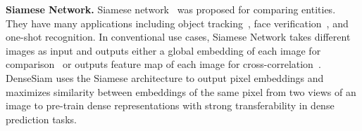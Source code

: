 \documentclass[runningheads]{llncs}
\newcommand{\tablestyle}[2]{\setlength{\tabcolsep}{#1}\renewcommand{\arraystretch}{#2}\centering\small}
\begin{document}
\noindent\textbf{Siamese Network.}
Siamese network~\cite{bromley1993signature} was proposed for comparing entities.
They have many applications including object tracking~\cite{siamfc}, face verification~\cite{facenet, deepface}, and one-shot recognition\cite{koch2015siamese}.
In conventional use cases, Siamese Network takes different images as input and outputs either a global embedding of each image for comparison~\cite{facenet, deepface, bromley1993signature, koch2015siamese}
or outputs feature map of each image for cross-correlation~\cite{siamfc}.
DenseSiam uses the Siamese architecture to output pixel embeddings and maximizes similarity between embeddings of the same pixel from two views of an image to pre-train dense representations with strong transferability in dense prediction tasks.

\begin{table}[t]
    \centering
    \small
    \caption{\textbf{Comparison of unsupervised dense representation learning methods}.
    }\label{tab:related_work}
\tablestyle{2pt}{1.1}
\end{table}
\end{document}
